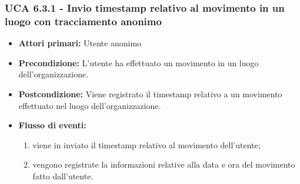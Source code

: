 \subsubsection{UCA 6.3.1 - Invio timestamp relativo al movimento in un luogo con tracciamento anonimo}
\begin{itemize}
	\item \textbf{Attori primari:} Utente anonimo
	\item \textbf{Precondizione:} L'utente ha effettuato un movimento in un luogo dell'organizzazione.
	\item \textbf{Postcondizione:} Viene registrato il timestamp relativo a un movimento effettuato nel luogo dell'organizzazione.
	\item \textbf{Flusso di eventi:}
	\begin{enumerate}
		\item viene in inviato il timestamp relativo al movimento dell'utente;
		\item vengono registrate la informazioni relative alla data e ora del movimento fatto dall'utente.
	\end{enumerate}
\end{itemize}

